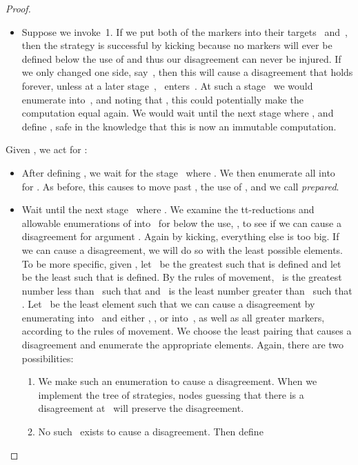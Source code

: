 \documentclass{LMCS}
\newcommand{\0}{\mathbf{0}}
\newcommand{\<}{\langle}
\renewcommand{\>}{\rangle}
\begin{document}
\begin{proof}
\begin{itemize}
\begin{enumerate}
\end{enumerate}
\item Suppose we invoke~1. If we put both of the markers into their
    targets~ and~, then the strategy is successful by kicking
    because no markers will ever be defined below the use of 
    and thus our disagreement can never be injured. If we only changed
    one side, say~,  then this will cause a disagreement that holds
    forever, unless at a later stage~,~ enters~. At such a
    stage~ we would enumerate  into~, and noting
    that , this could potentially make the
    computation equal again. We would wait until the next stage 
    where , and define , safe
    in the knowledge that this is now an immutable computation.
\end{itemize}

\noindent Given , we act for :
\begin{itemize}
\item After defining , we wait for the stage~ where
    . We then enumerate all  into~ for
    . As before, this causes  to move past
    , the use of , and we call 
    {\em prepared}.
\item Wait until the next stage~ where . We examine
    the tt-reductions  and allowable enumerations of
     into~ for  below the use,
    , to see if we can cause a disagreement for argument
    . Again by kicking, everything else is too big.  If we can cause
    a disagreement, we will do so with the least possible elements.  To
    be more specific, given , let~ be the greatest
     such that  is defined and let~ be the
    least  such that  is defined. By the rules of
    movement,~ is the greatest number less than~ such that
     and~ is the least number greater than~ such
    that . Let~ be the least element such that we can
    cause a disagreement by enumerating  into~ and
    either , , or 
    into~, as well as all greater markers, according to the rules of
    movement.  We choose the least pairing that causes a disagreement and
    enumerate the appropriate elements.  Again, there are two
    possibilities:
\begin{enumerate}
\item We make such an enumeration to cause a disagreement.
When we implement the tree of strategies, nodes guessing that there
is a disagreement at~ will preserve the disagreement.
\item No such~ exists to cause a disagreement. Then define
    
\end{enumerate}
\end{itemize}


\end{proof}
\end{document}
